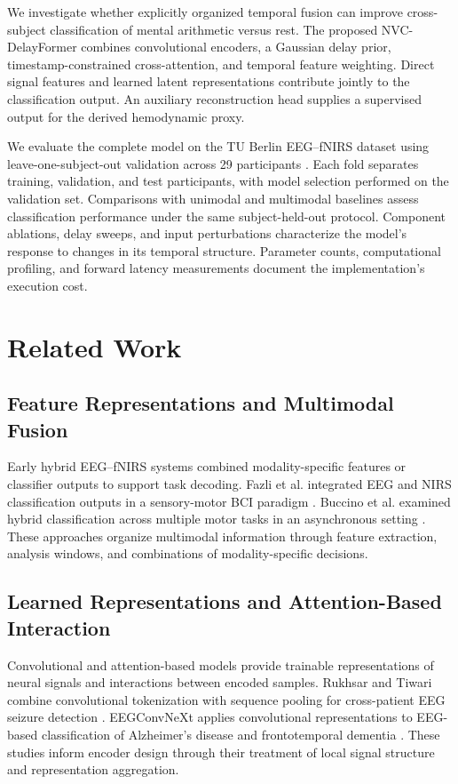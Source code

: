 \documentclass[final,5p,times,twocolumn]{elsarticle}
\begin{document}
We investigate whether explicitly organized temporal fusion can improve cross-subject classification of mental arithmetic versus rest. The proposed NVC-DelayFormer combines convolutional encoders, a Gaussian delay prior, timestamp-constrained cross-attention, and temporal feature weighting. Direct signal features and learned latent representations contribute jointly to the classification output. An auxiliary reconstruction head supplies a supervised output for the derived hemodynamic proxy.

We evaluate the complete model on the TU Berlin EEG--fNIRS dataset using leave-one-subject-out validation across 29 participants \cite{shin2017open}. Each fold separates training, validation, and test participants, with model selection performed on the validation set. Comparisons with unimodal and multimodal baselines assess classification performance under the same subject-held-out protocol. Component ablations, delay sweeps, and input perturbations characterize the model's response to changes in its temporal structure. Parameter counts, computational profiling, and forward latency measurements document the implementation's execution cost.

\section{Related Work}
\label{sec:related}

\subsection{Feature Representations and Multimodal Fusion}
Early hybrid EEG--fNIRS systems combined modality-specific features or classifier outputs to support task decoding. Fazli et al. integrated EEG and NIRS classification outputs in a sensory-motor BCI paradigm \cite{fazli2012enhanced}. Buccino et al. examined hybrid classification across multiple motor tasks in an asynchronous setting \cite{buccino2016hybrid}. These approaches organize multimodal information through feature extraction, analysis windows, and combinations of modality-specific decisions.

\subsection{Learned Representations and Attention-Based Interaction}
Convolutional and attention-based models provide trainable representations of neural signals and interactions between encoded samples. Rukhsar and Tiwari combine convolutional tokenization with sequence pooling for cross-patient EEG seizure detection \cite{salim2023lightweight}. EEGConvNeXt applies convolutional representations to EEG-based classification of Alzheimer's disease and frontotemporal dementia \cite{acharya2025eegconvnext}. These studies inform encoder design through their treatment of local signal structure and representation aggregation.
\end{document}

